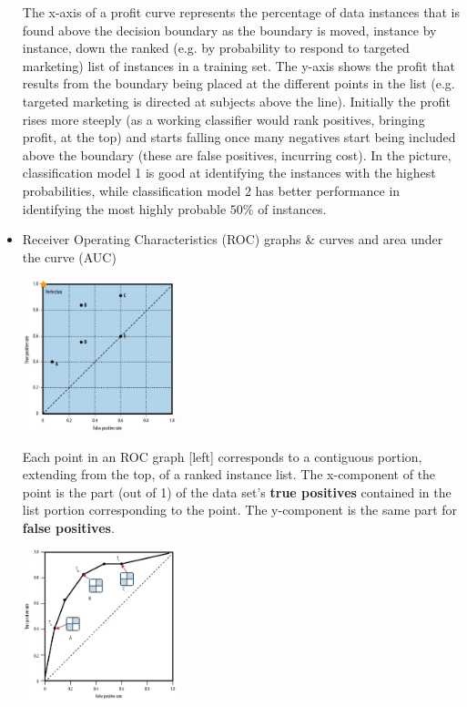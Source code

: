 \begin{itemize}
  \vspace{-0.5ex}
  {\small The x-axis of a profit curve represents the percentage of data instances that is found above the decision boundary as the boundary is moved, instance by instance, down the ranked (e.g. by probability to respond to targeted marketing) list of instances in a training set. The y-axis shows the profit that results from the boundary being placed at the different points in the list (e.g. targeted marketing is directed at subjects above the line). Initially the profit rises more steeply (as a working classifier would rank positives, bringing profit, at the top) and starts falling once many negatives start being included above the boundary (these are false positives, incurring cost). In the picture, classification model 1 is good at identifying the instances with the highest probabilities, while classification model 2 has better performance in identifying the most highly probable $50\%$ of instances. \par}

\newpage

\item Receiver Operating Characteristics (ROC) graphs \& curves and area under the curve (AUC)
  
  
  \includegraphics[width=0.35\textwidth]{8-3_nocap.png}\hspace{0.01\textwidth}\parbox[b]{0.23\textwidth}{\small Each point in an ROC graph [left] corresponds to a contiguous portion, extending from the top, of a ranked instance list. The x-component of the point is the part (out of 1) of the data set's \textbf{true positives} contained in the list portion corresponding to the point. The y-component is the same part for \textbf{false positives}.}\hspace{0.01\textwidth}\includegraphics[width=0.35\textwidth]{8-4_nocap.png}
  

\end{itemize}
